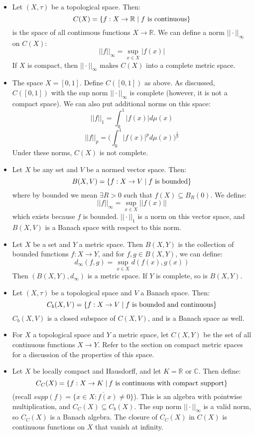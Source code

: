 \documentclass[11pt, oneside]{amsart}   	%
\theoremstyle{definition}
\begin{document}
	\begin{itemize}
	
		\item Let $(X, \tau)$ be a topological space. Then:
		$$
			C(X) = \{f : X\rightarrow\mathbb R \;|\; f\textnormal{ is continuous}\}
		$$
		is the space of all continuous functions $X\rightarrow\mathbb R$. We can define a norm $||\cdot||_\infty$ on $C(X)$:
		$$
			||f||_\infty = \sup_{x\in X} |f(x)|
		$$
		If $X$ is compact, then $||\cdot||_\infty$ makes $C(X)$ into a complete metric space. 
				
		\item The space $X = [0, 1]$. Define $C([0, 1])$ as above. As discussed, $C([0, 1])$ with the sup norm $||\cdot||_\infty$ 
		is complete (however, it is not a compact space). We can also put additional norms on this space:
		$$
			||f||_1 = \int_0^1 |f(x)|d\mu(x)
		$$
		$$
			||f||_p = \big(\int_0^1 |f(x)|^pd\mu(x)\big)^{\frac{1}{p}}
		$$
		Under these norms, $C(X)$ is not complete.
		
		\item Let $X$ be any set and $V$ be a normed vector space. Then:
		$$
			B(X, V) = \{f : X\rightarrow V\;|\; f\textnormal{ is bounded}\}
		$$
		where by bounded we mean $\exists R > 0$ such that $f(X)\subseteq B_R(0)$. We define:
		$$
			||f||_\infty = \sup_{x\in X} ||f(x)||
		$$
		which exists because $f$ is bounded. $||\cdot||_1$ is a norm on this vector space, and $B(X, V)$ is a Banach 
		space with respect to this norm. 
		
		\item Let $X$ be a set and $Y$ a metric space. Then $B(X, Y)$ is the collection of bounded functions $f : X
		\rightarrow Y$, and for $f, g\in B(X, Y)$, we can define:
		$$
			d_\infty(f, g) = \sup_{x\in X} d(f(x), g(x))
		$$
		Then $(B(X, Y), d_\infty)$ is a metric space. If $Y$ is complete, so is $B(X, Y)$. 
		
		\item Let $(X, \tau)$ be a topological space and $V$ a Banach space. Then:
		$$
			C_b(X, V) = \{f : X\rightarrow V\;|\; f \textnormal{ is bounded and continuous}\}
		$$
		$C_b(X, V)$ is a closed subspace of $C(X, V)$, and is a Banach space as well. 
		
		\item For $X$ a topological space and $Y$ a metric space, let $C(X, Y)$ be the set of all continuous functions $X
		\rightarrow Y$. Refer to the section on compact metric spaces for a discussion of the properties of this space.
		
		\item Let $X$ be locally compact and Hausdorff, and let $K = \mathbb R$ or $\mathbb C$. Then define:
		$$
			C_C(X) = \{f : X\rightarrow K\;|\:f \textnormal{ is continuous with compact support}\}
		$$
		(recall $supp(f) = \overline{\{x\in X : f(x)\neq 0\}}$). This is an algebra with pointwise multiplication, and $C_C(X)
		\subseteq C_b(X)$. The sup norm $||\cdot||_\infty$ is a valid norm, so $C_C(X)$ is a Banach algebra. The closure 
		of $C_C(X)$ in $C(X)$ is continuous functions on $X$ that vanish at infinity. 
		
	\end{itemize}
\end{document}
